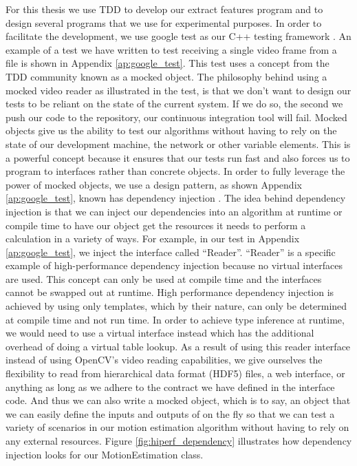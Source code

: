 For this thesis we use TDD to develop our extract features program and to design
several programs that we use for experimental purposes. In order to facilitate
the development, we use google test as our C++ testing framework
\cite{googletest}. An example of a test we have written to test receiving a
single video frame from a file is shown in Appendix \ref{ap:google_test}. This
test uses a concept from the TDD community known as a mocked object. The
philosophy behind using a mocked video reader as illustrated in the test, is
that we don't want to design our tests to be reliant on the state of the current
system. If we do so, the second we push our code to the repository, our
continuous integration tool will fail. Mocked objects give us the ability to
test our algorithms without having to rely on the state of our development
machine, the network or other variable elements. This is a powerful concept
because it ensures that our tests run fast and also forces us to program to
interfaces rather than concrete objects. In order to fully leverage the power of
mocked objects, we use a design pattern, as shown Appendix \ref{ap:google_test},
known has dependency injection \cite{gamma1995design}. The idea behind
dependency injection is that we can inject our dependencies into an algorithm at
runtime or compile time to have our object get the resources it needs to perform
a calculation in a variety of ways. For example, in our test in Appendix
\ref{ap:google_test}, we inject the interface called ``Reader''. ``Reader'' is a
specific example of high-performance dependency injection because no virtual
interfaces are used. This concept can only be used at compile time and the
interfaces cannot be swapped out at runtime. High performance dependency
injection is achieved by using only templates, which by their nature, can only
be determined at compile time and not run time. In order to achieve type
inference at runtime, we would need to use a virtual interface instead which has
the additional overhead of doing a virtual table lookup. As a result of using
this reader interface instead of using OpenCV's video reading capabilities, we
give ourselves the flexibility to read from hierarchical data format (HDF5)
files, a web interface, or anything as long as we adhere to the contract we have
defined in the interface code. And thus we can also write a mocked object, which
is to say, an object that we can easily define the inputs and outputs of on the
fly so that we can test a variety of scenarios in our motion estimation
algorithm without having to rely on any external resources. Figure
\ref{fig:hiperf_dependency} illustrates how dependency injection looks for our
MotionEstimation class.

